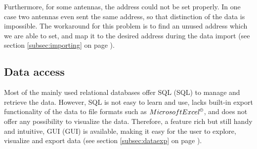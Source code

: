 Furthermore, for some antennas, the address could not be set properly. In one case two antennas even sent the same address, so that distinction of the data is impossible. The workaround for this problem is to find an unused address which we are able to set, and map it to the desired address during the data import (see section \ref{subsec:importing} on page \pageref{subsec:importing}).   

\subsection{Data access}
\label{subsec:dataccess}

Most of the mainly used relational databases offer \ac{SQL} (SQL) to manage and retrieve the data. However, SQL is not easy to learn and use, lacks built-in export functionality of the data to file formats such as $Microsoft Excel^{\copyright}$, and does not offer any possibility to visualize the data. Therefore, a feature rich but still handy and intuitive, \ac{GUI} (GUI) is available, making it easy for the user to explore, visualize and export data (see section \ref{subsec:dataexp} on page \pageref{subsec:dataexp}).
